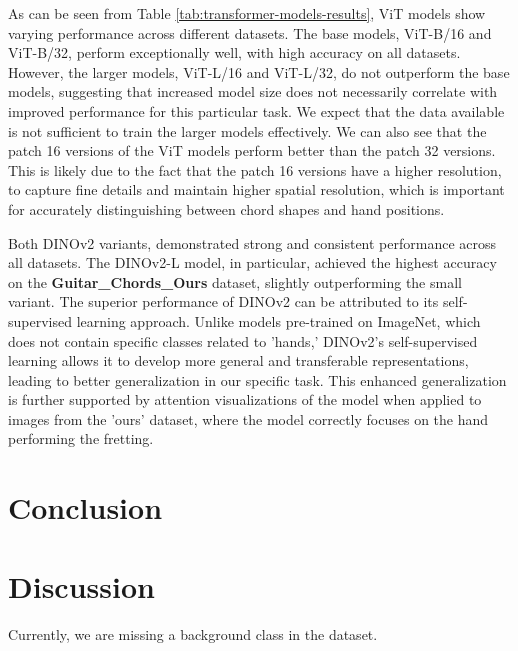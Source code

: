 \documentclass[10pt,twocolumn,letterpaper]{article}
\begin{document}
As can be seen from Table \ref{tab:transformer-models-results}, ViT models show varying performance across different datasets. The base models, ViT-B/16 and ViT-B/32, perform exceptionally well, with high accuracy on all datasets. However, the larger models, ViT-L/16 and ViT-L/32, do not outperform the base models, suggesting that increased model size does not necessarily correlate with improved performance for this particular task. We expect that the data available is not sufficient to train the larger models effectively. We can also see that the patch 16 versions of the ViT models perform better than the patch 32 versions. This is likely due to the fact that the patch 16 versions have a higher resolution, to capture fine details and maintain higher spatial resolution, which is important for accurately distinguishing between chord shapes and hand positions.

Both DINOv2 variants, demonstrated strong and consistent performance across all datasets. The DINOv2-L model, in particular, achieved the highest accuracy on the \textbf{Guitar\_Chords\_Ours} dataset, slightly outperforming the small variant. The superior performance of DINOv2 can be attributed to its self-supervised learning approach. Unlike models pre-trained on ImageNet, which does not contain specific classes related to 'hands,' DINOv2's self-supervised learning allows it to develop more general and transferable representations, leading to better generalization in our specific task. This enhanced generalization is further supported by attention visualizations of the model when applied to images from the 'ours' dataset, where the model correctly focuses on the hand performing the fretting.

\section{Conclusion}

\section{Discussion}
Currently, we are missing a background class in the dataset.


    {\small
        
        
    }
\end{document}
